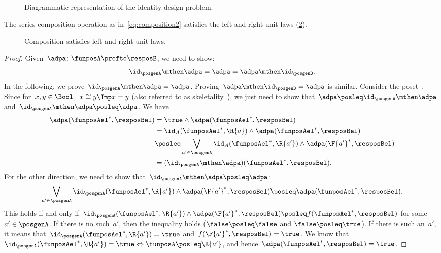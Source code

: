 \begin{figure}[h!]
    \centering
    \caption{Diagrammatic representation of the identity design problem.} \label{fig:identitydp}
\end{figure}

\begin{lemma}
    \label{lem:compositionunital}
    The series composition operation as in~\cref{eq:composition2} satisfies the left and right unit laws (\cref{fig:compositionunital}).
\end{lemma}
\begin{figure}[h!]
    \centering
    \caption{Composition satisfies left and right unit laws.} \label{fig:compositionunital}
\end{figure}
\begin{proof}
    Given~$\adpa\colon \funposA\profto \resposB$, we need to show:
    \begin{equation*}
        \id_\posgenA \mthen \adpa= \adpa = \adpa\mthen \id_\posgenB.
    \end{equation*}
    In the following, we prove~$\id_\posgenA \mthen \adpa = \adpa$.
    Proving~$\adpa\mthen \id_\posgenB=\adpa$ is similar.
    Consider the poset~\Bool. Since for~$x,y\in \Bool$,~$x\cong y \Imp x=y$ (also referred to as skeletality~\cite{fong2019}), we just need to show that~$\adpa\posleq \id_\posgenA\mthen \adpa$ and~$\id_\posgenA\mthen \adpa\posleq \adpa$.
    We have
    \begin{equation*}
        \label{eq:dp_unit_1}
        \begin{aligned}
            \adpa(\funposAel^*,\resposBel)&=\true \wedge \adpa(\funposAel^*,\resposBel)\\
            &= \id_A(\funposAel^*,\R{a}) \wedge \adpa(\funposAel^*,\resposBel)\\
            &\posleq \bigvee_{a'\in \posgenA}\id_A(\funposAel^*,\R{a'})\wedge \adpa(\F{a'}^*,\resposBel)\\
            &=(\id_\posgenA\mthen \adpa)(\funposAel^*,\resposBel).
        \end{aligned}
    \end{equation*}
    For the other direction, we need to show that~$\id_\posgenA\mthen \adpa\posleq \adpa$:
    \begin{equation*}
        \label{eq:dp_unit_2}
        \bigvee_{a'\in \posgenA}\id_\posgenA(\funposAel^*,\R{a'})\wedge \adpa(\F{a'}^*,\resposBel) \posleq \adpa(\funposAel^*,\resposBel).
    \end{equation*}
    This holds if and only if~$\id_\posgenA(\funposAel^*,\R{a'})\wedge \adpa(\F{a'}^*,\resposBel) \posleq f(\funposAel^*,\resposBel)$ for some~$a'\in \posgenA$.
    If there is no such~$a'$, then the inequality holds ($\false \posleq \false$ and $\false \posleq \true$).
    If there is such an~$a'$, it means that~$\id_\posgenA(\funposAel^*,\R{a'})=\true$ and~$f(\F{a'}^*,\resposBel)=\true$.
    We know that~$\id_\posgenA(\funposAel^*,\R{a'})=\true \Leftrightarrow \funposA\posleq \R{a'}$, and hence~$\adpa(\funposAel^*,\resposBel)=\true$.
\end{proof}
